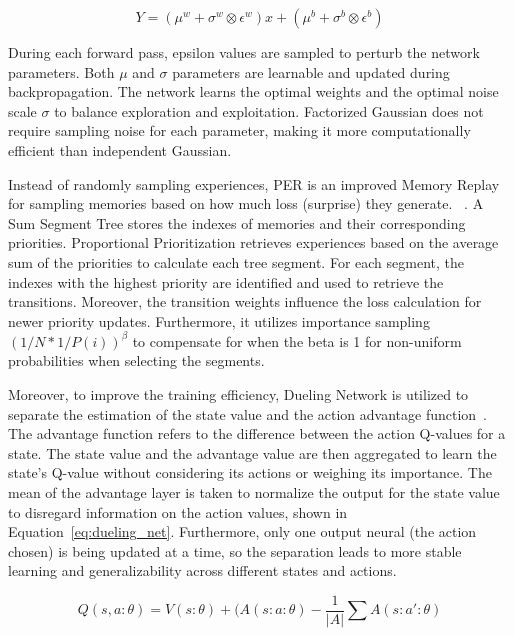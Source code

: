 \documentclass{article}
\begin{document}
\vspace*{-7pt}
\begin{equation}
    Y = (\mu^w + \sigma^w \otimes \epsilon^w)x + (\mu^b + \sigma^b \otimes \epsilon^b)
\end{equation}
\vspace*{-9pt}

During each forward pass, epsilon values are sampled to perturb the network parameters. Both $\mu$ and $\sigma $ parameters are learnable and updated during backpropagation. The network learns the optimal weights and the optimal noise scale $\sigma$ to balance exploration and exploitation. Factorized Gaussian does not require sampling noise for each parameter, making it more computationally efficient than independent Gaussian.

Instead of randomly sampling experiences, PER is an improved Memory Replay for sampling memories based on how much loss (surprise) they generate. ~\cite{schaul_prioritized_2016}.
A Sum Segment Tree stores the indexes of memories and their corresponding priorities. Proportional Prioritization retrieves experiences based on the average sum of the priorities to calculate each tree segment.
For each segment, the indexes with the highest priority are identified and used to retrieve the transitions.
Moreover, the transition weights influence the loss calculation for newer priority updates.
Furthermore, it utilizes importance sampling \((1/N * 1/P(i))^{\beta}\) to compensate for when the beta is 1 for non-uniform probabilities when selecting the segments.

Moreover, to improve the training efficiency, Dueling Network is utilized to separate the estimation of the state value and the action advantage function~\cite{wang_dueling_2016}.
The advantage function refers to the difference between the action Q-values for a state.
The state value and the advantage value are then aggregated to learn the state's Q-value without considering its actions or weighing its importance.
The mean of the advantage layer is taken to normalize the output for the state value to disregard information on the action values, shown in Equation~\ref{eq:dueling_net}.
Furthermore, only one output neural (the action chosen) is being updated at a time, so the separation leads to more stable learning and generalizability across different states and actions.

\vspace*{-10pt}
\begin{equation}
    Q(s,a:\theta) = V(s:\theta) + ( A(s:a:\theta) - \frac{1}{|A|} \sum A(s:a':\theta) 
\end{equation}
\label{eq:dueling_net}
\vspace*{-12pt}
\end{document}
